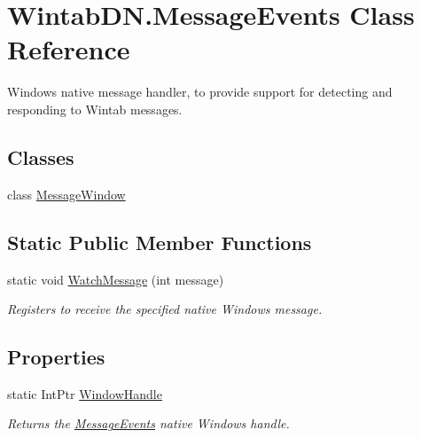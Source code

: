 \hypertarget{class_wintab_d_n_1_1_message_events}{}\section{Wintab\+D\+N.\+Message\+Events Class Reference}
\label{class_wintab_d_n_1_1_message_events}


Windows native message handler, to provide support for detecting and responding to Wintab messages.  


\subsection*{Classes}
\begin{DoxyCompactItemize}
\item 
class \mbox{\hyperlink{class_wintab_d_n_1_1_message_events_1_1_message_window}{Message\+Window}}
\end{DoxyCompactItemize}
\subsection*{Static Public Member Functions}
\begin{DoxyCompactItemize}
\item 
static void \mbox{\hyperlink{class_wintab_d_n_1_1_message_events_a6e2e3e429a0a6b9d5e75d0d7a50c079d}{Watch\+Message}} (int message)
\begin{DoxyCompactList}\small\item\em Registers to receive the specified native Windows message. \end{DoxyCompactList}\end{DoxyCompactItemize}
\subsection*{Properties}
\begin{DoxyCompactItemize}
\item 
static Int\+Ptr \mbox{\hyperlink{class_wintab_d_n_1_1_message_events_a9136eca6f023dfd73fd1c9edfe7ded9e}{Window\+Handle}}
\begin{DoxyCompactList}\small\item\em Returns the \mbox{\hyperlink{class_wintab_d_n_1_1_message_events}{Message\+Events}} native Windows handle. \end{DoxyCompactList}\end{DoxyCompactItemize}
